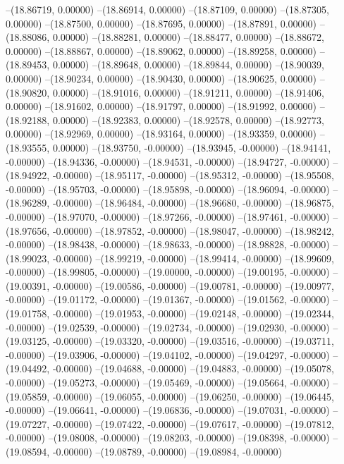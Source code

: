 --(18.86719, 0.00000)
--(18.86914, 0.00000)
--(18.87109, 0.00000)
--(18.87305, 0.00000)
--(18.87500, 0.00000)
--(18.87695, 0.00000)
--(18.87891, 0.00000)
--(18.88086, 0.00000)
--(18.88281, 0.00000)
--(18.88477, 0.00000)
--(18.88672, 0.00000)
--(18.88867, 0.00000)
--(18.89062, 0.00000)
--(18.89258, 0.00000)
--(18.89453, 0.00000)
--(18.89648, 0.00000)
--(18.89844, 0.00000)
--(18.90039, 0.00000)
--(18.90234, 0.00000)
--(18.90430, 0.00000)
--(18.90625, 0.00000)
--(18.90820, 0.00000)
--(18.91016, 0.00000)
--(18.91211, 0.00000)
--(18.91406, 0.00000)
--(18.91602, 0.00000)
--(18.91797, 0.00000)
--(18.91992, 0.00000)
--(18.92188, 0.00000)
--(18.92383, 0.00000)
--(18.92578, 0.00000)
--(18.92773, 0.00000)
--(18.92969, 0.00000)
--(18.93164, 0.00000)
--(18.93359, 0.00000)
--(18.93555, 0.00000)
--(18.93750, -0.00000)
--(18.93945, -0.00000)
--(18.94141, -0.00000)
--(18.94336, -0.00000)
--(18.94531, -0.00000)
--(18.94727, -0.00000)
--(18.94922, -0.00000)
--(18.95117, -0.00000)
--(18.95312, -0.00000)
--(18.95508, -0.00000)
--(18.95703, -0.00000)
--(18.95898, -0.00000)
--(18.96094, -0.00000)
--(18.96289, -0.00000)
--(18.96484, -0.00000)
--(18.96680, -0.00000)
--(18.96875, -0.00000)
--(18.97070, -0.00000)
--(18.97266, -0.00000)
--(18.97461, -0.00000)
--(18.97656, -0.00000)
--(18.97852, -0.00000)
--(18.98047, -0.00000)
--(18.98242, -0.00000)
--(18.98438, -0.00000)
--(18.98633, -0.00000)
--(18.98828, -0.00000)
--(18.99023, -0.00000)
--(18.99219, -0.00000)
--(18.99414, -0.00000)
--(18.99609, -0.00000)
--(18.99805, -0.00000)
--(19.00000, -0.00000)
--(19.00195, -0.00000)
--(19.00391, -0.00000)
--(19.00586, -0.00000)
--(19.00781, -0.00000)
--(19.00977, -0.00000)
--(19.01172, -0.00000)
--(19.01367, -0.00000)
--(19.01562, -0.00000)
--(19.01758, -0.00000)
--(19.01953, -0.00000)
--(19.02148, -0.00000)
--(19.02344, -0.00000)
--(19.02539, -0.00000)
--(19.02734, -0.00000)
--(19.02930, -0.00000)
--(19.03125, -0.00000)
--(19.03320, -0.00000)
--(19.03516, -0.00000)
--(19.03711, -0.00000)
--(19.03906, -0.00000)
--(19.04102, -0.00000)
--(19.04297, -0.00000)
--(19.04492, -0.00000)
--(19.04688, -0.00000)
--(19.04883, -0.00000)
--(19.05078, -0.00000)
--(19.05273, -0.00000)
--(19.05469, -0.00000)
--(19.05664, -0.00000)
--(19.05859, -0.00000)
--(19.06055, -0.00000)
--(19.06250, -0.00000)
--(19.06445, -0.00000)
--(19.06641, -0.00000)
--(19.06836, -0.00000)
--(19.07031, -0.00000)
--(19.07227, -0.00000)
--(19.07422, -0.00000)
--(19.07617, -0.00000)
--(19.07812, -0.00000)
--(19.08008, -0.00000)
--(19.08203, -0.00000)
--(19.08398, -0.00000)
--(19.08594, -0.00000)
--(19.08789, -0.00000)
--(19.08984, -0.00000)
